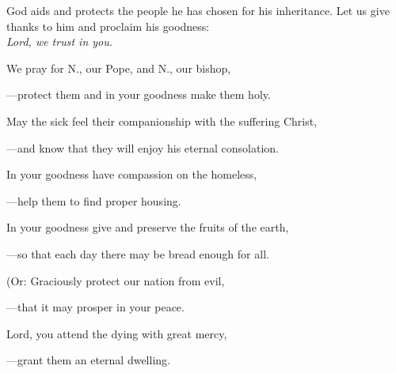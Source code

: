 \intercessions\indent

\begin{hangpar}

God aids and protects the people he has chosen for his inheritance. Let us give thanks to him and proclaim his goodness:\\
\emph{Lord, we trust in you.}

\medskip We pray for N., our Pope, and N., our bishop,

{\color{red}---\thinspace}protect them and in your goodness make them holy.

\medskip May the sick feel their companionship with the suffering Christ,

{\color{red}---\thinspace}and know that they will enjoy his eternal consolation.

\medskip In your goodness have compassion on the homeless,

{\color{red}---\thinspace}help them to find proper housing.

\medskip In your goodness give and preserve the fruits of the earth,

{\color{red}---\thinspace}so that each day there may be bread enough for all.

\medskip (Or: Graciously protect our nation from evil,

{\color{red}---\thinspace}that it may prosper in your peace.

\medskip Lord, you attend the dying with great mercy,

{\color{red}---\thinspace}grant them an eternal dwelling.

\end{hangpar}

